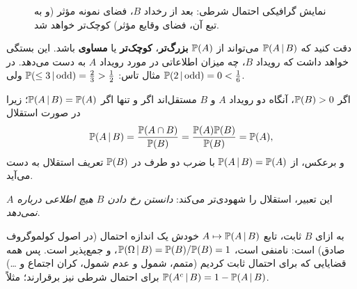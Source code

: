 \begin{figure}[H]
\centering
{}
\caption{نمایش گرافیکی احتمال شرطی: بعد از رخداد $B$، فضای نمونه مؤثر (و به تبع آن، فضای وقایع مؤثر) کوچک‌تر خواهد شد.}
\end{figure}

\begin{note}
\notetitle دقت کنید که $\mathbb{P}(A\,|\, B)$ می‌تواند از $\mathbb{P}(A)$ \textcolor{red!70!black}{\textbf{بزرگ‌تر}}، \textcolor{blue!70!black}{\textbf{کوچک‌تر}} یا \textcolor{green!50!black}{\textbf{مساوی}} باشد. این بستگی خواهد داشت که رویداد $B$، چه میزان اطلاعاتی در مورد رویداد $A$ به دست می‌دهد. در مثال تاس: $\mathbb{P}(\le3\,|\,\text{odd})=\frac23>\frac12$ ولی $\mathbb{P}(2\,|\,\text{odd})=0<\frac16$.
\end{note}

\begin{theorem}
اگر $\mathbb{P}(B)>0$، آنگاه دو رویداد $A$ و $B$ مستقل‌اند اگر و تنها اگر $\mathbb{P}(A\,|\, B)=\mathbb{P}(A)$؛ زیرا در صورت استقلال
\[
\mathbb{P}(A\,|\, B)=\frac{\mathbb{P}(A\cap B)}{\mathbb{P}(B)}=\frac{\mathbb{P}(A)\mathbb{P}(B)}{\mathbb{P}(B)}=\mathbb{P}(A),
\]
و برعکس، از $\mathbb{P}(A\,|\, B)=\mathbb{P}(A)$ با ضرب دو طرف در $\mathbb{P}(B)$ تعریف استقلال به دست می‌آید.
\end{theorem}
این تعبیر، استقلال را شهودی‌تر می‌کند: \emph{دانستن رخ دادن $B$ هیچ اطلاعی درباره $A$ نمی‌دهد}.

\begin{note}
\notetitle به ازای $B$ ثابت، تابع $A\mapsto\mathbb{P}(A\,|\, B)$ خودش یک اندازه احتمال (در اصول کولموگروف صادق) است: نامنفی است، $\mathbb{P}(\Omega\,|\, B)=\mathbb{P}(B)/\mathbb{P}(B)=1$، و جمع‌پذیر است. پس همه قضایایی که برای احتمال ثابت کردیم (متمم، شمول و عدم شمول، کران اجتماع و \ldots) برای احتمال شرطی نیز برقرارند؛ مثلاً $\mathbb{P}(A^c\,|\, B)=1-\mathbb{P}(A\,|\, B)$.
\end{note}

